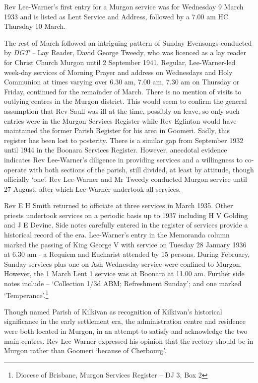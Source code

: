 \medskip


Rev Lee-Warner's first entry for a Murgon service was for Wednesday 9 March 1933 and is listed as Lent Service and Address\emph{,} followed by a 7.00 am HC Thursday 10 March.



The rest of March followed an intriguing pattern of Sunday Evensongs conducted by \emph{DGT --} Lay Reader, David George Tweedy, who was licenced as a lay reader for Christ Church Murgon until 2 September 1941. Regular, Lee-Warner-led week-day services of Morning Prayer and address on Wednesdays and Holy Communion at times varying over 6.30 am, 7.00 am, 7.30 am on Thursday or Friday, continued for the remainder of March. There is no mention of visits to outlying centres in the Murgon district. This would seem to confirm the general assumption that Rev Saull was ill at the time, possibly on leave, so only such entries were in the Murgon Services Register while Rev Eglinton would have maintained the former Parish Register for his area in Goomeri. Sadly, this register has been lost to posterity. There is a similar gap from September 1932 until 1944 in the Boonara Services Register. However, anecdotal evidence indicates Rev Lee-Warner's diligence in providing services and a willingness to co-operate with both sections of the parish, still divided, at least by attitude, though officially `one'. Rev Lee-Warner and Mr Tweedy conducted Murgon service until 27 August, after which Lee-Warner undertook all services.



Rev E H Smith returned to officiate at three services in March 1935. Other priests undertook services on a periodic basis up to 1937 including H V Golding and J E Devine. Side notes carefully entered in the register of services provide a historical record of the era. Lee-Warner's entry in the Memoranda column marked the passing of King George V with service on Tuesday 28 January 1936 at 6.30 am - a Requiem and Eucharist attended by 15 persons. During February, Sunday services plus one on Ash Wednesday service were confined to Murgon. However, the 1 March Lent 1 service was at Boonara at 11.00 am. Further side notes include -- `Collection 1/3d ABM; Refreshment Sunday'; and one marked `Temperance'.\footnote{Diocese of Brisbane, Murgon Services Register -- DJ 3, Box 2}


Though named Parish of Kilkivan as recognition of Kilkivan's historical significance in the early settlement era, the administration centre and residence were both located in Murgon, in an attempt to satisfy and acknowledge the two main centres. Rev Lee Warner expressed his opinion that the rectory should be in Murgon rather than Goomeri `because of Cherbourg'.



